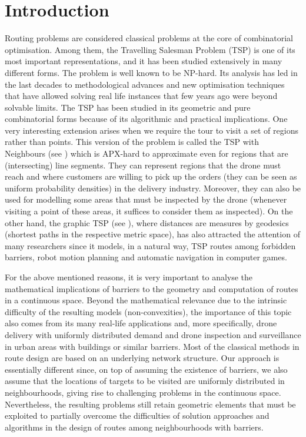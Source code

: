 \documentclass[a4paper,  review, authoryear, 1p., doubleblind]{elsarticle}
\begin{document}
	\section{Introduction}
	Routing problems are considered classical problems at the core of combinatorial optimisation. Among them, the Travelling Salesman Problem (TSP) is one of its most important representations, and it has been studied extensively in many different forms. The problem is well known to be NP-hard. Its analysis has led in the last decades to methodological advances and new optimisation techniques that have allowed solving real life instances that few years ago were beyond solvable limits. The TSP has been studied in its geometric and pure combinatorial forms because of its algorithmic and practical implications. One very interesting extension arises when we require the tour to visit a set of regions rather than points. This version of the problem is called the TSP with Neighbours (see  \citet{arkin_approximation_1994}) which is APX-hard to approximate even for regions that are (intersecting) line segments.  They can represent regions that the drone must reach and where customers are willing to pick up the orders (they can be seen as uniform probability densities) in the delivery industry. Moreover, they can also be used for modelling some areas that must be inspected by the drone (whenever visiting a point of these areas, it suffices to consider them as inspected).  On the other hand, the graphic TSP (see \citet{moemke_approximating_2011}), where distances are measures by geodesics (shortest paths in the respective metric space), has also attracted the attention of many researchers since it models, in a natural way, TSP routes among forbidden barriers, robot motion planning and automatic navigation in computer games. 
	
	For the above mentioned reasons, it is very important to analyse the mathematical implications of barriers to the geometry and computation of routes in a continuous space. Beyond the mathematical relevance due to the intrinsic difficulty of the resulting models (non-convexities), the importance of this topic also comes from its many real-life applications and, more specifically, drone delivery with uniformly distributed demand and drone inspection and surveillance in urban areas with buildings or similar barriers.  Most of the classical methods in route design are based on an underlying network structure. Our approach is essentially different since, on top of assuming the existence of barriers, we also assume that the locations of targets to be visited are uniformly distributed in neighbourhoods, giving rise to challenging problems in the continuous space. Nevertheless, the resulting problems still retain geometric elements that must be exploited to partially overcome the difficulties of solution approaches and algorithms in the design of routes among neighbourhoods with barriers.
	
\end{document}
